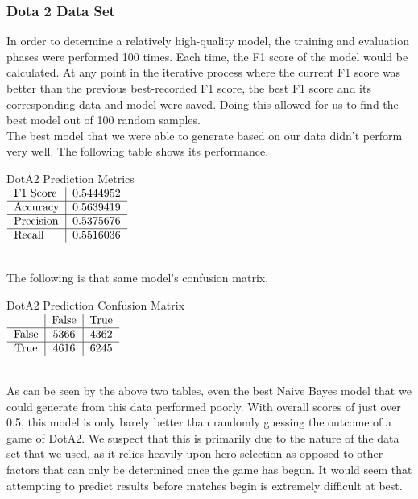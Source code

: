 \documentclass[sigconf]{acmart}
\begin{document}
\subsubsection{Dota 2 Data Set }
In order to determine a relatively high-quality model, the training and evaluation phases were performed 100 times. Each time, the F1 score of the model would be calculated. At any point in the iterative process where the current F1 score was better than the previous best-recorded F1 score, the best F1 score and its corresponding data and model were saved. Doing this allowed for us to find the best model out of 100 random samples.\\
The best model that we were able to generate based on our data didn't perform very well. The following table shows its performance.\\
\begin{center}
DotA2 Prediction Metrics\\
$\begin{tabular}{l|l}
F1 Score & 0.5444952 \\ \hline
Accuracy & 0.5639419 \\ \hline
Precision & 0.5375676 \\ \hline
Recall & 0.5516036 \\
\end{tabular}$
\end{center}\\
The following is that same model's confusion matrix.\\
\begin{center}
DotA2 Prediction Confusion Matrix\\
$\begin{tabular}{c|c|c}
 & False & True \\ \hline
False & 5366 & 4362 \\ \hline
True & 4616 & 6245 \\
\end{tabular}$
\end{center}\\
As can be seen by the above two tables, even the best Naive Bayes model that we could generate from this data performed poorly. With overall scores of just over 0.5, this model is only barely better than randomly guessing the outcome of a game of DotA2. We suspect that this is primarily due to the nature of the data set that we used, as it relies heavily upon hero selection as opposed to other factors that can only be determined once the game has begun. It would seem that attempting to predict results before matches begin is extremely difficult at best.
\end{document}

